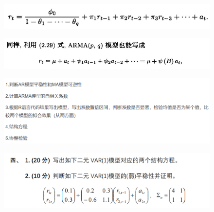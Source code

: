 \documentclass[UTF8]{ctexart}
\begin{document}
     \begin{figure}[h]
         \centering
         \includegraphics[scale=0.4]{images7.png}
     \end{figure}

     \begin{figure}[h]
         \centering
         \includegraphics[scale=0.42]{images8.png}
     \end{figure}

\hspace*{\fill}

     \begin{figure}[h]
         \centering
         \includegraphics[scale=0.42]{images10.png}
     \end{figure}

\hspace*{\fill}

     \begin{figure}[h]
         \centering
         \includegraphics[scale=0.32]{images11.png}
     \end{figure}










    
\end{document}
